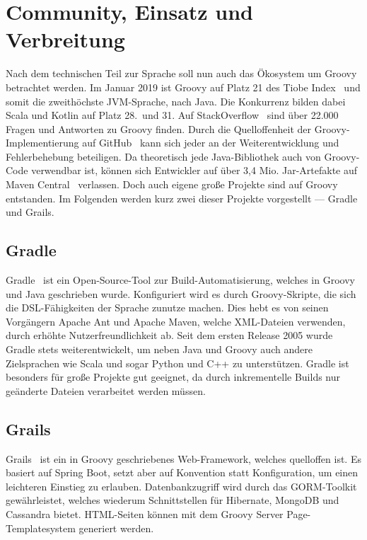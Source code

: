 \documentclass[a4paper]{article}
\begin{document}

\section{Community, Einsatz und Verbreitung}\label{sec:community}

Nach dem technischen Teil zur Sprache soll nun auch das Ökosystem um Groovy betrachtet werden.
Im Januar 2019 ist Groovy auf Platz 21 des Tiobe Index~\cite{tiobe-index} und somit die zweithöchste JVM-Sprache, nach Java.
Die Konkurrenz bilden dabei Scala und Kotlin auf Platz 28.~und 31.
Auf StackOverflow~\cite{stackoverflow:groovy} sind über 22.000 Fragen und Antworten zu Groovy finden.
Durch die Quelloffenheit der Groovy-Implementierung auf GitHub~\cite{github:groovy} kann sich jeder an der Weiterentwicklung und Fehlerbehebung beteiligen.
Da theoretisch jede Java-Bibliothek auch von Groovy-Code verwendbar ist, können sich Entwickler auf über 3,4 Mio. Jar-Artefakte auf Maven Central~\cite{maven-central} verlassen.
Doch auch eigene große Projekte sind auf Groovy entstanden.
Im Folgenden werden kurz zwei dieser Projekte vorgestellt --- Gradle und Grails.

\subsection{Gradle}\label{subsec:gradle}

Gradle~\cite{gradle} ist ein Open-Source-Tool zur Build-Automatisierung, welches in Groovy und Java geschrieben wurde.
Konfiguriert wird es durch Groovy-Skripte, die sich die DSL-Fähigkeiten der Sprache zunutze machen.
Dies hebt es von seinen Vorgängern Apache Ant und Apache Maven, welche XML-Dateien verwenden, durch erhöhte Nutzerfreundlichkeit ab.
Seit dem ersten Release 2005 wurde Gradle stets weiterentwickelt, um neben Java und Groovy auch andere Zielsprachen wie Scala und sogar Python und C++ zu unterstützen.
Gradle ist besonders für große Projekte gut geeignet, da durch inkrementelle Builds nur geänderte Dateien verarbeitet werden müssen.

\subsection{Grails}\label{subsec:grails}

Grails~\cite{grails} ist ein in Groovy geschriebenes Web-Framework, welches quelloffen ist.
Es basiert auf Spring Boot, setzt aber auf Konvention statt Konfiguration, um einen leichteren Einstieg zu erlauben.
Datenbankzugriff wird durch das GORM-Toolkit gewährleistet, welches wiederum Schnittstellen für Hibernate, MongoDB und Cassandra bietet.
HTML-Seiten können mit dem Groovy Server Page-Templatesystem generiert werden.
\end{document}
